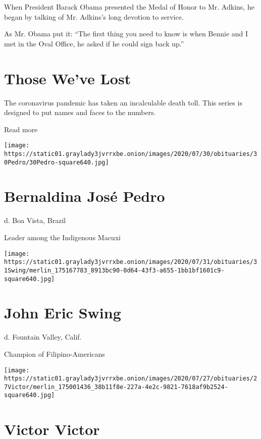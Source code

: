 When President Barack Obama presented the Medal of Honor to Mr. Adkins,
he began by talking of Mr. Adkins's long devotion to service.

As Mr. Obama put it: ``The first thing you need to know is when Bennie
and I met in the Oval Office, he asked if he could sign back up.''

\href{https://www.nytimes3xbfgragh.onion/interactive/2020/obituaries/people-died-coronavirus-obituaries.html?action=click\&pgtype=Article\&state=default\&region=BELOW_MAIN_CONTENT\&context=covid_obits_promo}{}

\hypertarget{those-weve-lost}{%
\section{Those We've Lost}\label{those-weve-lost}}

The coronavirus pandemic has taken an incalculable death toll. This
series is designed to put names and faces to the numbers.

Read more

\texttt{[image: https://static01.graylady3jvrrxbe.onion/images/2020/07/30/obituaries/30Pedro/30Pedro-square640.jpg]}

\hypertarget{bernaldina-josuxe9-pedro}{%
\section{Bernaldina José Pedro}\label{bernaldina-josuxe9-pedro}}

d. Boa Vista, Brazil

Leader among the Indigenous Macuxi

\texttt{[image: https://static01.graylady3jvrrxbe.onion/images/2020/07/31/obituaries/31Swing/merlin\_175167783\_8913bc90-0d64-43f3-a655-1bb1bf1601c9-square640.jpg]}

\hypertarget{john-eric-swing}{%
\section{John Eric Swing}\label{john-eric-swing}}

d. Fountain Valley, Calif.

Champion of Filipino-Americans

\texttt{[image: https://static01.graylady3jvrrxbe.onion/images/2020/07/27/obituaries/27Victor/merlin\_175001436\_38b11f8e-227a-4e2c-9821-7618af9b2524-square640.jpg]}

\hypertarget{victor-victor}{%
\section{Victor Victor}\label{victor-victor}}

